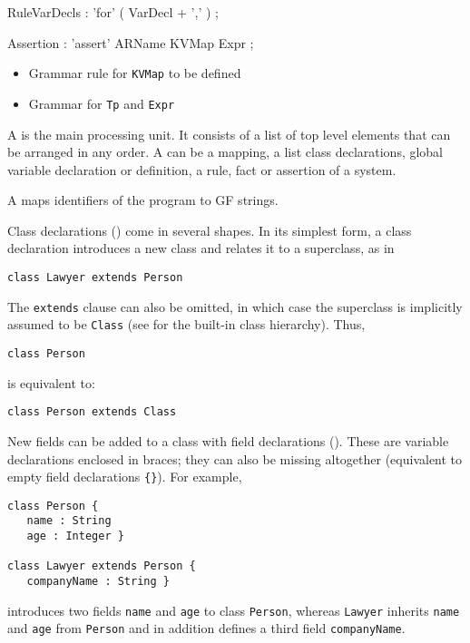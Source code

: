 \begin{rail}
RuleVarDecls : 'for' ( VarDecl + ',' )
;
\end{rail}

\hypertarget{syn:Assertion}{}
\begin{rail}
Assertion : 'assert' ARName KVMap Expr
;
\end{rail}


\begin{itemize}
\item Grammar rule for \texttt{KVMap} to be defined
\item Grammar for \texttt{Tp} and \texttt{Expr}
\end{itemize}


A  is the main processing unit. It consists of a list
of top level elements that can be arranged in any order. A
 can be a mapping, a list class declarations,
global variable declaration or definition, a rule, fact or assertion of a system.

A  maps identifiers of the program to GF
strings.

Class declarations () come in several shapes. In
its simplest form, a class declaration introduces a new class and relates it
to a superclass, as in
\begin{lstlisting}
class Lawyer extends Person
\end{lstlisting}  

The \texttt{extends} clause can also be omitted, in which case the superclass
is implicitly assumed to be \texttt{Class} (see  for the
built-in class hierarchy). Thus,
\begin{lstlisting}
class Person
\end{lstlisting}  
is equivalent to:
\begin{lstlisting}
class Person extends Class
\end{lstlisting}

New fields can be added to a class with field declarations
(). These are variable declarations
enclosed in braces; they can also be missing altogether (equivalent to empty
field declarations \texttt{\{\}}). For example, 
\begin{lstlisting}
class Person {
   name : String
   age : Integer }

class Lawyer extends Person {
   companyName : String }
\end{lstlisting}  
introduces two fields \texttt{name} and \texttt{age} to class \texttt{Person},
whereas \texttt{Lawyer} inherits \texttt{name} and \texttt{age} from
\texttt{Person} and in addition defines a third field \texttt{companyName}.

